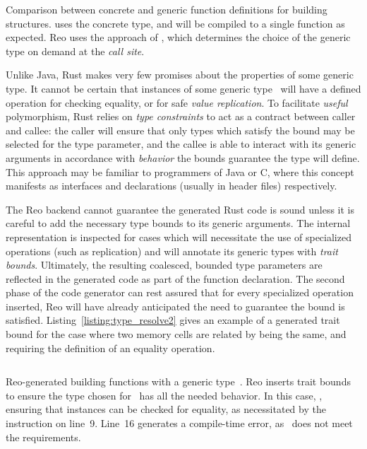 \begin{listing}[ht]
	\centering
	\inputminted[]{rust}{type_resolve.rs}
	\caption[Concrete vs.\ generic protocol-building functions.]{Comparison between concrete and generic function definitions for building  structures.  uses the concrete  type, and will be compiled to a single function as expected. Reo uses the approach of , which determines the choice of the generic type on demand at the \textit{call site}.}
	\label{listing:type_resolve}
\end{listing}

Unlike Java, Rust makes very few promises about the properties of some generic type. It cannot be certain that instances of some generic type~ will have a defined operation for checking equality, or for safe \textit{value replication}. To facilitate \textit{useful} polymorphism, Rust relies on \textit{type constraints} to act as a contract between caller and callee: the caller will ensure that only types which satisfy the bound may be selected for the type parameter, and the callee is able to interact with its generic arguments in accordance with \textit{behavior} the bounds guarantee the type will define. This approach may be familiar to programmers of Java or C, where this concept manifests as interfaces and declarations (usually in header files) respectively. 

The Reo backend cannot guarantee the generated Rust code is sound unless it is careful to add the necessary type bounds to its generic arguments. The internal representation is inspected for cases which will necessitate the use of specialized operations (such as replication) and will annotate its generic types with \textit{trait bounds}. Ultimately, the resulting coalesced, bounded type parameters are reflected in the generated code as part of the function declaration. The second phase of the code generator can rest assured that for every specialized operation inserted, Reo will have already anticipated the need to guarantee the bound is satisfied. Listing~\ref{listing:type_resolve2} gives an example of a generated trait bound for the case where two memory cells are related by being the same, and requiring the definition of an equality operation.

\begin{listing}[ht]
	\centering
	\inputminted[]{rust}{type_resolve2.rs}
	\caption[Reo-generated trait bounds for generic types.]{Reo-generated  building functions with a generic type~. Reo inserts trait bounds to ensure the type chosen for~ has all the needed behavior. In this case, , ensuring that instances can be checked for equality, as necessitated by the instruction on line~9. Line~16 generates a compile-time error, as~ does not meet the requirements.}
	\label{listing:type_resolve2}
\end{listing}



